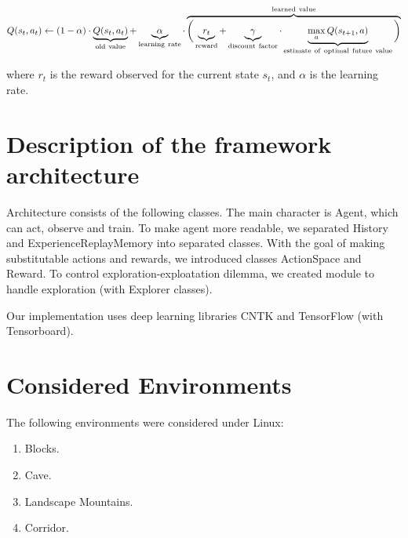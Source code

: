 \documentclass{article}
\begin{document}
$$Q(s_{t},a_{t}) \leftarrow (1-\alpha) \cdot 
\underbrace{Q(s_{t},a_{t})}_{\rm old~value} + 
\underbrace{\alpha}_{\rm learning~rate} \cdot  
\overbrace{\bigg( \underbrace{r_{t}}_{\rm reward} + 
\underbrace{\gamma}_{\rm discount~factor} \cdot 
\underbrace{\max_{a}Q(s_{t+1}, a)}_{\rm 
estimate~of~optimal~future~value} \bigg) }^{\rm learned~value} $$

where $r_{t}$ is the reward observed for the current state 
$s_t$, and $\alpha$ is the learning rate.


\section{Description of the framework architecture}

Architecture consists of the following classes. The main character is 
Agent, which can act, observe and train.
To make agent more readable, we separated History and 
ExperienceReplayMemory into separated classes.
With the goal of making substitutable actions and rewards, 
we introduced classes ActionSpace and Reward.
To control exploration-exploatation dilemma, we created module to 
handle exploration (with Explorer classes).

Our implementation uses deep learning libraries CNTK 
and TensorFlow (with Tensorboard).

\section{Considered Environments}

The following environments were considered under Linux:
\begin{enumerate}
    \item Blocks. 
    \item Cave.
    \item Landscape Mountains. 
    \item Corridor. 
\end{enumerate}
\end{document}
